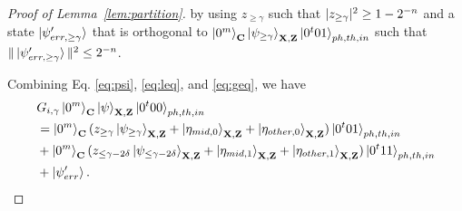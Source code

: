 \begin{proof}[Proof of Lemma~\ref{lem:partition}]
by using $z_{\geq \gamma}$ such that $|z_{\geq \gamma}|^2\geq 1-2^{-n}$ and a state  $\ket{\psi'_{err,\geq \gamma}}$ that is orthogonal to $\ket{0^m}_{\mathbf{C}}\ket{\psi_{\geq\gamma}}_{\mathbf{X},\mathbf{Z}}\ket{0^t01}_{ph,th,in}$ such that $\|\ket{\psi'_{err,\geq \gamma}}\|^2 \leq 2^{-n}$.


Combining Eq. \ref{eq:psi}, \ref{eq:leq}, and \ref{eq:geq}, we have
\begin{align}
\begin{split}
& G_{i,\gamma}\ket{0^m}_{\mathbf{C}}\ket{\psi}_{\mathbf{X},\mathbf{Z}}\ket{0^t00}_{ph,th,in} \\
&=\ket{0^m}_{\mathbf{C}}(z_{\geq \gamma}\ket{\psi_{\geq\gamma}}_{\mathbf{X},\mathbf{Z}}+\ket{\eta_{mid,0}}_{\mathbf{X},\mathbf{Z}}+\ket{\eta_{other,0}}_{\mathbf{X},\mathbf{Z}})\ket{0^t01}_{ph,th,in} \\
&+\ket{0^m}_{\mathbf{C}}(z_{\leq \gamma-2\delta}\ket{\psi_{\leq\gamma-2\delta}}_{\mathbf{X},\mathbf{Z}}+\ket{\eta_{mid,1}}_{\mathbf{X},\mathbf{Z}}+\ket{\eta_{other,1}}_{\mathbf{X},\mathbf{Z}})\ket{0^t11}_{ph,th,in} \\
&+ \ket{\psi'_{err}}. 
\end{split} \label{eq:resulting_state}
\end{align}


\end{proof}
